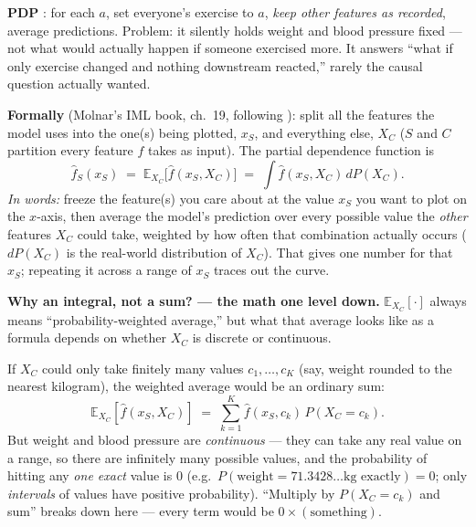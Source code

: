 \textbf{PDP} : for each $a$, set everyone's exercise
to $a$, \emph{keep other features as recorded}, average predictions.
Problem: it silently holds weight and blood pressure fixed --- not what
would actually happen if someone exercised more. It answers ``what if only
exercise changed and nothing downstream reacted,'' rarely the causal
question actually wanted.

\medskip
\noindent\textbf{Formally} (Molnar's IML book, ch.~19, following
): split all the features the model uses into the
one(s) being plotted, $x_S$, and everything else, $X_C$ ($S$ and $C$
partition every feature $f$ takes as input). The partial dependence
function is
\begin{equation}
\hat f_S(x_S) \;=\; \mathbb{E}_{X_C}\big[\hat f(x_S, X_C)\big]
\;=\; \int \hat f(x_S, X_C)\, dP(X_C).
\label{eq:pdp-def}
\end{equation}
\noindent\textit{In words:} freeze the feature(s) you care about at the
value $x_S$ you want to plot on the $x$-axis, then average the model's
prediction over every possible value the \emph{other} features $X_C$ could
take, weighted by how often that combination actually occurs
($dP(X_C)$ is the real-world distribution of $X_C$). That gives one number
for that $x_S$; repeating it across a range of $x_S$ traces out the curve.

\medskip
\noindent\textbf{Why an integral, not a sum? --- the math one level down.}
$\mathbb{E}_{X_C}[\cdot]$ always means ``probability-weighted average,'' but
what that average looks like as a formula depends on whether $X_C$ is
discrete or continuous.

If $X_C$ could only take finitely many values $c_1,\dots,c_K$ (say, weight
rounded to the nearest kilogram), the weighted average would be an
ordinary sum:
$$\mathbb{E}_{X_C}[\hat f(x_S,X_C)] \;=\; \sum_{k=1}^K \hat f(x_S,c_k)\,
P(X_C=c_k).$$
But weight and blood pressure are \emph{continuous} --- they can take any
real value on a range, so there are infinitely many possible values, and
the probability of hitting any \emph{one exact} value is $0$ (e.g.\
$P(\text{weight}=71.3428\ldots\text{kg exactly})=0$; only \emph{intervals}
of values have positive probability). ``Multiply by $P(X_C=c_k)$ and sum''
breaks down here --- every term would be $0 \times (\text{something})$.

